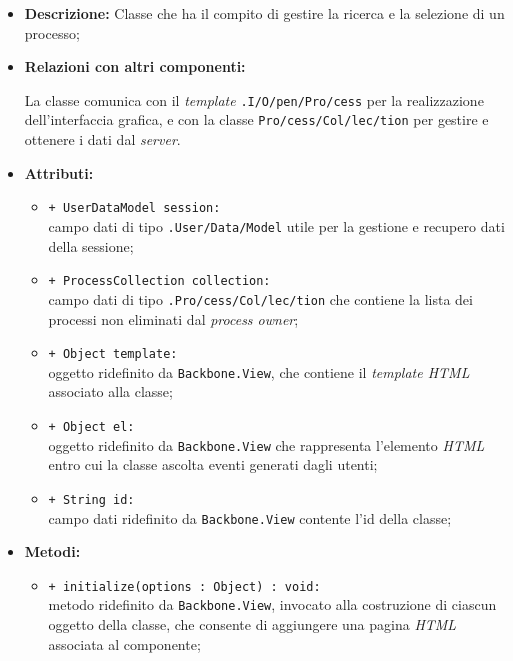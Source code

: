 \begin{flushleft}
\begin{itemize}
\item \textbf{Descrizione:} Classe che ha il compito di gestire la ricerca e la selezione di un processo;
\item \textbf{Relazioni con altri componenti:}
\begin{sloppypar}
La classe comunica con il \textit{template} \texttt{\viewAdmin{}.I\fshyp{}O\fshyp{}pen\fshyp{}Pro\fshyp{}cess} per la realizzazione dell'interfaccia grafica, e con la classe \texttt{\collection{}Pro\fshyp{}cess\fshyp{}Col\fshyp{}lec\fshyp{}tion} per gestire e ottenere i dati dal \textit{server}.
\end{sloppypar}
\item \textbf{Attributi:}
\begin{sloppypar}
\begin{itemize}
\item \texttt{+ UserDataModel session:}\\ campo dati di tipo \texttt{\logic{}.User\fshyp{}Data\fshyp{}Model} utile per la gestione e recupero dati della sessione;
\item \texttt{+ ProcessCollection collection:}\\ campo dati di tipo \texttt{\collectionp{}.Pro\fshyp{}cess\fshyp{}Col\fshyp{}lec\fshyp{}tion} che contiene la lista dei processi non eliminati dal \textit{process owner};
\item \texttt{+ Object template:}\\ oggetto ridefinito da \texttt{Backbone.View}, che contiene il \textit{template HTML} associato alla classe;
\item \texttt{+ Object el:}\\ oggetto ridefinito da \texttt{Backbone.View} che rappresenta l'elemento \textit{HTML} entro cui la classe ascolta eventi generati dagli utenti;
\item \texttt{+ String id:}\\ campo dati ridefinito da \texttt{Backbone.View} contente l'id della classe;
\end{itemize}
\end{sloppypar}
\item \textbf{Metodi:}
\begin{sloppypar}
\begin{itemize}
\item \texttt{+ initialize(options : Object) : void:}\\ metodo ridefinito da \texttt{Backbone.View}, invocato alla costruzione di ciascun oggetto della classe, che consente di aggiungere una pagina \textit{HTML} associata al componente;

\end{itemize}
\end{sloppypar}
\end{itemize}
\end{flushleft}
